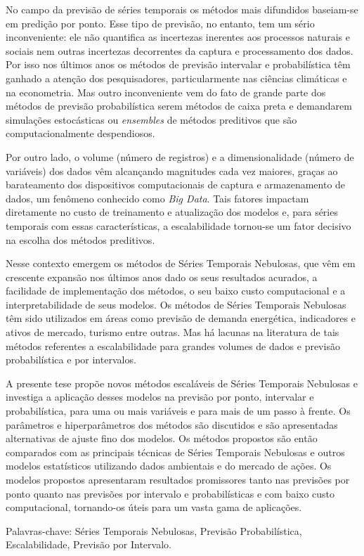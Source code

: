 \begin{resumo}[Resumo]

No campo da previsão de séries temporais os métodos mais difundidos baseiam-se em predição por ponto. Esse tipo de previsão, no entanto, tem um sério inconveniente: ele não quantifica as incertezas inerentes aos processos naturais e sociais nem outras incertezas decorrentes da captura e processamento dos dados. Por isso nos últimos anos os métodos de previsão intervalar e probabilística têm ganhado a atenção dos pesquisadores, particularmente nas ciências climáticas e na econometria. Mas outro inconveniente vem do fato de grande parte dos métodos de previsão probabilística serem métodos de caixa preta e demandarem simulações estocásticas ou \textit{ensembles} de métodos preditivos que são computacionalmente despendiosos.

Por outro lado, o volume (número de registros) e a dimensionalidade (número de variáveis) dos dados vêm alcançando magnitudes cada vez maiores, graças ao barateamento dos dispositivos computacionais de captura e armazenamento de dados, um fenômeno conhecido como \textit{Big Data}. Tais fatores impactam diretamente no custo de treinamento e atualização dos modelos e, para séries temporais com essas características, a escalabilidade tornou-se um fator decisivo na escolha dos métodos preditivos.

Nesse contexto emergem os métodos de Séries Temporais Nebulosas, que vêm em crescente expansão nos últimos anos dado os seus resultados acurados, a facilidade de implementação dos métodos, o seu baixo custo computacional e a interpretabilidade de seus modelos. Os métodos de Séries Temporais Nebulosas têm sido utilizados em áreas como previsão de demanda energética, indicadores e ativos de mercado, turismo entre outras. Mas há lacunas na literatura de tais métodos referentes a escalabilidade para grandes volumes de dados e  previsão probabilística e por intervalos.

A presente tese propõe novos métodos escaláveis de Séries Temporais Nebulosas e investiga a aplicação desses modelos na previsão por ponto, intervalar e probabilística, para uma ou mais variáveis e para mais de um passo à frente. Os parâmetros e hiperparâmetros dos métodos são discutidos e são apresentadas alternativas de ajuste fino dos modelos. Os métodos propostos são então comparados com as principais técnicas de Séries Temporais Nebulosas e outros modelos estatísticos utilizando dados ambientais e do mercado de ações. Os modelos propostos apresentaram resultados promissores tanto nas previsões por ponto quanto nas previsões por intervalo e probabilísticas e com baixo custo computacional, tornando-os úteis para um vasta gama de aplicações.
        
Palavras-chave: Séries Temporais Nebulosas, Previsão Probabilística, Escalabilidade, Previsão por Intervalo.

\end{resumo}


